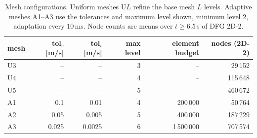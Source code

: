 \documentclass[preprint,12pt,number]{elsarticle}
\begin{document}
\begin{table}[!htbp]
\centering
\caption{Mesh configurations. Uniform meshes U$L$ refine the base mesh $L$ levels. Adaptive
meshes A1--A3 use the tolerances and maximum level shown, minimum level 2, adaptation every
$10\,$ms. Node counts are means over $t \ge 6.5\,$s of DFG 2D-2.}
\label{tab:levels}
\begin{tabular}{lrrrrr}
\toprule
mesh & tol$_v$ [m/s] & tol$_i$ [m/s] & max level & element budget & nodes (2D-2) \\
\midrule
U3 & -- & -- & 3 & -- & 29\,152 \\
U4 & -- & -- & 4 & -- & 115\,648 \\
U5 & -- & -- & 5 & -- & 460\,672 \\
A1 & 0.1   & 0.01   & 4 & 200\,000 & 50\,764 \\
A2 & 0.05  & 0.005  & 5 & 400\,000 & 187\,229 \\
A3 & 0.025 & 0.0025 & 6 & 1\,500\,000 & 707\,574 \\
\bottomrule
\end{tabular}
\end{table}
\end{document}
